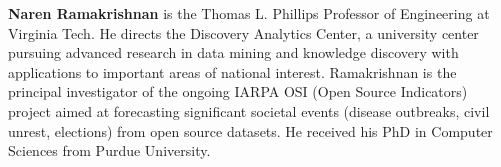 \documentclass[letterpaper]{article}
\begin{document}
{\bf Naren Ramakrishnan} is the Thomas L. Phillips Professor of Engineering at
Virginia Tech. He directs the Discovery Analytics Center, a university
center pursuing advanced research in data mining and knowledge discovery
with applications to important areas of national interest. Ramakrishnan
is the principal investigator of the ongoing IARPA OSI (Open Source
Indicators) project aimed at forecasting significant societal events
(disease outbreaks, civil unrest, elections) from open source datasets.
He received his PhD in Computer Sciences from Purdue University.
\end{document}
